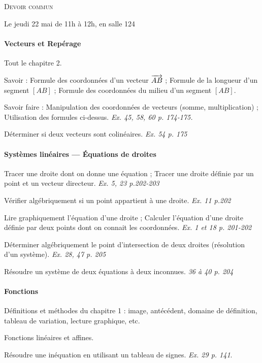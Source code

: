 \documentclass[10pt]{article}
\begin{document}
\begin{center}
  \textsc{Devoir commun}

  Le jeudi 22 mai de 11h à 12h, en salle 124
\end{center}

\paragraph{Vecteurs et Repérage}

\begin{compactitem}
  \item Tout le chapitre 2.
  \item Savoir : Formule des coordonnées d'un vecteur $\overrightarrow{AB}$ ; Formule de la longueur d'un segment $[AB]$ ; Formule des coordonnées du milieu d'un segment $[AB]$.
  \item Savoir faire : Manipulation des coordonnées de vecteurs (somme, multiplication) ; Utilisation des formules ci-dessus. \emph{Ex. 45, 58, 60 p. 174-175.}
  \item Déterminer si deux vecteurs sont colinéaires. \emph{Ex. 54 p. 175}
\end{compactitem}

\paragraph{Systèmes linéaires --- Équations de droites}
\begin{compactitem}
  \item Tracer une droite dont on donne une équation ; Tracer une droite définie par un point et un vecteur directeur. \emph{Ex. 5, 23 p.202-203}
  \item Vérifier algébriquement si un point appartient à une droite. \emph{Ex. 11 p.202}
  \item Lire graphiquement l'équation d'une droite ; Calculer l'équation d'une droite définie par deux points dont on connait les coordonnées. \emph{Ex. 1 et 18 p. 201-202}
  \item Déterminer algébriquement le point d'intersection de deux droites (résolution d'un système). \emph{Ex. 28, 47 p. 205}
  \item Résoudre un système de deux équations à deux inconnues. \emph{36 à 40 p. 204}
\end{compactitem}


\paragraph{Fonctions}
\begin{compactitem}
  \item Définitions et méthodes du chapitre 1 : image, antécédent, domaine de définition, tableau de variation, lecture graphique, etc.
  \item Fonctions linéaires et affines.
  \item Résoudre une inéquation en utilisant un tableau de signes. \emph{Ex. 29 p. 141}.
\end{compactitem}
\end{document}
